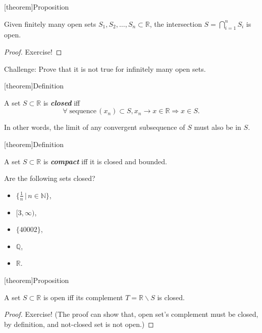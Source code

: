 \documentclass[12pt]{report}
\theoremstyle{definition}
\begin{document}
[theorem]{Proposition}
\begin{intersection of finite open sets are open}\label{prop:3}
    Given finitely many open sets $S_1, S_2,\ldots,S_n\subset\mathbb{R}$,
    the intersection $S=\bigcap_{i=1}^{n}S_i$ is open.
\end{intersection of finite open sets are open}

\begin{proof}
    Exercise!
\end{proof} 

Challenge: Prove that it is not true for infinitely many open sets.

[theorem]{Definition}
\begin{closed set}
    A set $S\subset\mathbb{R}$ is \textbf{\emph{closed}} iff \[
        \forall\;\text{sequence}\,(x_n)\subset S,
        x_n\rightarrow x\in\mathbb{R}\Longrightarrow x\in S.
    \]
\end{closed set}
In other words, the limit of any convergent subsequence of $S$
must also be in $S$.

[theorem]{Definition}
\begin{compact set}
    A set $S\subset\mathbb{R}$ is \textbf{\emph{compact}} iff it is closed and
    bounded.
\end{compact set}

\begin{ex}
    Are the following sets closed?
    \begin{itemize}
        \item $\{\frac{1}{n}\,|\,n\in\mathbb{N}\}$,
        \item $[3,\infty)$, %
        \item $\{40002\}$,
        \item $\mathbb{Q}$,
        \item $\mathbb{R}$.
    \end{itemize}
\end{ex} 

[theorem]{Proposition}
\begin{open set complement is closed}
    A set $S\subset\mathbb{R}$ is open iff
    its complement $T=\mathbb{R}\backslash S$ is closed.
\end{open set complement is closed}

\begin{proof}
    Exercise!
    (The proof can show that, open set's complement must be closed, by definition,
    and not-closed set is not open.)
\end{proof} 
\end{document}
